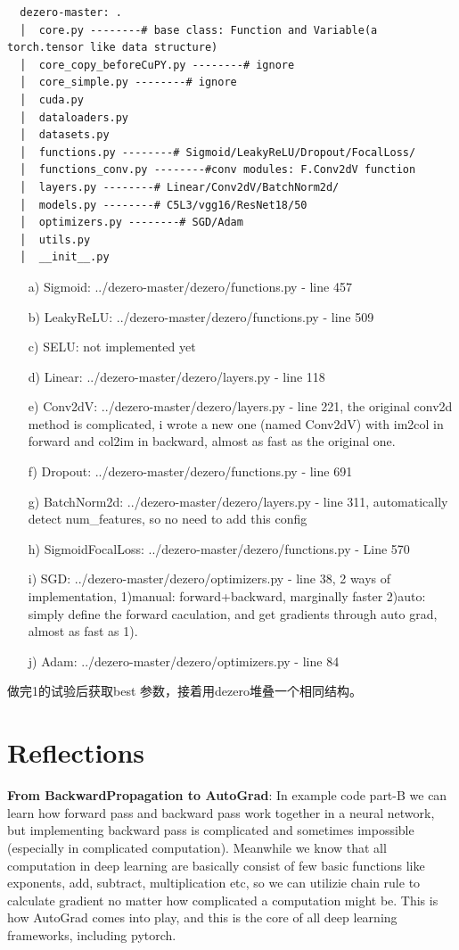 \documentclass{article}
\newcommand{\secs}[1]{\section*{#1}}
\begin{document}
\begin{verbatim}
  dezero-master: .
  │  core.py --------# base class: Function and Variable(a torch.tensor like data structure)
  │  core_copy_beforeCuPY.py --------# ignore 
  │  core_simple.py --------# ignore
  │  cuda.py
  │  dataloaders.py
  │  datasets.py
  │  functions.py --------# Sigmoid/LeakyReLU/Dropout/FocalLoss/
  │  functions_conv.py --------#conv modules: F.Conv2dV function
  │  layers.py --------# Linear/Conv2dV/BatchNorm2d/
  │  models.py --------# C5L3/vgg16/ResNet18/50
  │  optimizers.py --------# SGD/Adam
  │  utils.py
  │  __init__.py
\end{verbatim}
\begin{itemize}
  \item[a)] Sigmoid: ../dezero-master/dezero/functions.py - line 457
  \item[b)] LeakyReLU: ../dezero-master/dezero/functions.py - line 509
  \item[c)] SELU: not implemented yet
  \item[d)] Linear: ../dezero-master/dezero/layers.py - line 118
  \item[e)] Conv2dV: ../dezero-master/dezero/layers.py - line 221, the original conv2d method is complicated, i wrote a new one (named Conv2dV) with im2col in forward and col2im in backward, almost as fast as the original one.
  \item[f)] Dropout: ../dezero-master/dezero/functions.py - line 691
  \item[g)] BatchNorm2d: ../dezero-master/dezero/layers.py - line 311, automatically detect num\_features, so no need to add this config
  \item[h)] SigmoidFocalLoss: ../dezero-master/dezero/functions.py - Line 570
  \item[i)] SGD: ../dezero-master/dezero/optimizers.py - line 38, 2 ways of implementation, 1)manual: forward+backward, marginally faster 2)auto: simply define the forward caculation, and get gradients through auto grad, almost as fast as 1).
  \item[j)] Adam: ../dezero-master/dezero/optimizers.py - line 84   
\end{itemize}


做完1的试验后获取best 参数，接着用dezero堆叠一个相同结构。



\secs{Reflections}
\noindent\textbf{From BackwardPropagation to AutoGrad}: In example code part-B we can learn how forward pass and backward pass work together in a neural network, but implementing backward pass is complicated and sometimes impossible (especially in complicated computation). Meanwhile we know that all computation in deep learning are basically consist of few basic functions like exponents, add, subtract, multiplication etc, so we can utilizie chain rule to calculate gradient no matter how complicated a computation might be. This is how AutoGrad comes into play, and this is the core of  all deep learning frameworks, including pytorch.\\
\end{document}
